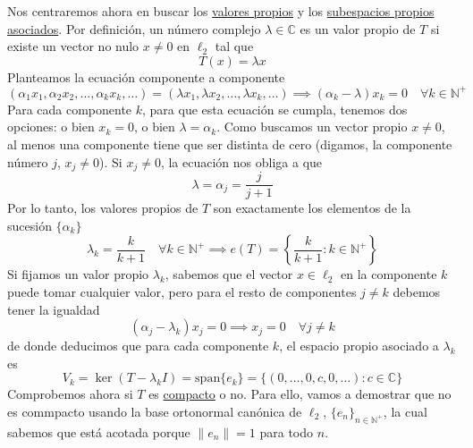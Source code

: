 \begin{ejercicio}
    \noindent
    Nos centraremos ahora en buscar los \underline{valores propios} y los \underline{subespacios propios asociados}. Por definición, un número complejo $\lambda \in \mathbb{C}$ es un valor propio de $T$ si existe un vector no nulo $x \neq 0$ en $\ell_2$ tal que
    $$T(x) = \lambda x$$
    Planteamos la ecuación componente a componente
    $$(\alpha_1 x_1, \alpha_2 x_2, \dots, \alpha_k x_k, \dots) = (\lambda x_1, \lambda x_2, \dots, \lambda x_k, \dots) \implies (\alpha_k - \lambda) x_k = 0 \quad \forall k \in \mathbb{N}^+$$
    Para cada componente $k$, para que esta ecuación se cumpla, tenemos dos opciones: o bien $x_k = 0$, o bien $\lambda = \alpha_k$. Como buscamos un vector propio $x \neq 0$, al menos una componente tiene que ser distinta de cero (digamos, la componente número $j$, $x_j \neq 0$). Si $x_j \neq 0$, la ecuación nos obliga a que
    $$\lambda = \alpha_j = \frac{j}{j+1}$$
    Por lo tanto, los valores propios de $T$ son exactamente los elementos de la sucesión $\{\alpha_k\}$
    $$\lambda_k = \frac{k}{k+1} \quad \forall k \in \mathbb{N}^+\implies e(T)=\left\{\dfrac{k}{k+1} : k \in \mathbb{N}^+\right\}$$
    Si fijamos un valor propio $\lambda_k$, sabemos que el vector $x\in \ell_2$ en la componente $k$ puede tomar cualquier valor, pero para el resto de componentes $j\neq k$ debemos tener la igualdad
    \begin{equation*}
        (\alpha_j - \lambda_k) x_j = 0 \implies x_j = 0 \quad \forall j \neq k
    \end{equation*}
    de donde deducimos que para cada componente $k$, el espacio propio asociado a $\lambda_k$ es
    $$V_k = \ker(T - \lambda_k I) = \text{span}\{e_k\}= \{ (0, \dots, 0, c, 0, \dots) : c \in \mathbb{C} \}$$
    Comprobemos ahora si $T$ es \underline{compacto} o no. Para ello, vamos a demostrar que no es commpacto usando la base ortonormal canónica de $\ell_2$, $\{e_n\}_{n \in \mathbb{N}^+}$, la cual sabemos que está acotada porque $\|e_n\| = 1$ para todo $n$. \\


\end{ejercicio}
